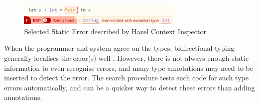 \begin{figure}[h]\centering
\includegraphics[width=0.7\textwidth]{Media/Figures/context_inspector}
\caption{Selected Static Error described by Hazel Context Inspector}
\label{fig:ContextInspector}
\end{figure}

When the programmer and system agree on the types, bidirectional typing generally localises the error(s) well \cite{BidirectionalTypes, MarkedLocalisation}. However, there is not always enough static information to even recognise errors, and many type annotations may need to be inserted to detect the error. The search procedure tests such code for such type errors automatically, and can be a quicker way to detect these errors than adding annotations. 

